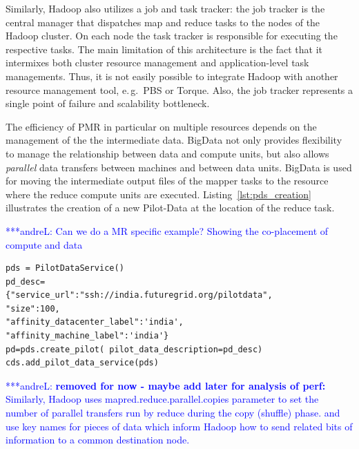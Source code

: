 \documentclass{acm_proc_article-sp}
\newcommand{\alnote}[1]{ {\textcolor{blue} { ***andreL: #1 }}}
\newcommand{\alnote}[1]{}
\newcommand{\pilotmapreduce}{Pilot-MapReduce\xspace}
\begin{document}
Similarly, Hadoop also utilizes a job and task tracker: the job
tracker is the central manager that dispatches map and reduce tasks to
the nodes of the Hadoop cluster. On each node the task tracker is
responsible for executing the respective tasks. The main limitation of
this architecture is the fact that it intermixes both cluster resource
management and application-level task managements. Thus, it is not
easily possible to integrate Hadoop with another resource management
tool, e.\,g.\ PBS or Torque. Also, the job tracker represents a single
point of failure and scalability bottleneck.


The efficiency of PMR in particular on multiple resources depends on
the management of the the intermediate data. BigData not only
provides flexibility to manage the relationship between data and
compute units, but also allows {\it parallel} data transfers between
machines and between data units.  BigData is used for moving the
intermediate output files of the mapper tasks to the resource where
the reduce compute units are executed.  Listing~\ref{lst:pds_creation}
illustrates the creation of a new Pilot-Data at the location of the
reduce task.


\alnote{Can we do a MR specific example? Showing the co-placement of compute and 
data}

\lstset{
language=Python,
frame=single,
captionpos=b,
stringstyle=\ttfamily,
basicstyle=\scriptsize\ttfamily
}
\noindent\begin{minipage}{0.47 \textwidth}
\begin{lstlisting}[caption={\textbf{Pilot Data Creation:} Instantiation of a Pilot Data using Pilot Data Description}, label={lst:pds_creation}]
pds = PilotDataService()
pd_desc=
{"service_url":"ssh://india.futuregrid.org/pilotdata",
"size":100,
"affinity_datacenter_label":'india',
"affinity_machine_label":'india'}
pd=pds.create_pilot( pilot_data_description=pd_desc)
cds.add_pilot_data_service(pds)
\end{lstlisting}
\end{minipage}

\alnote{\textbf{removed for now - maybe add later for analysis of perf:} Similarly, Hadoop uses mapred.reduce.parallel.copies parameter to set
the number of parallel transfers run by reduce during the
copy (shuffle) phase.  and use key names for pieces of data which
inform Hadoop how to send related bits of information to a common
destination node.}
\end{document}
